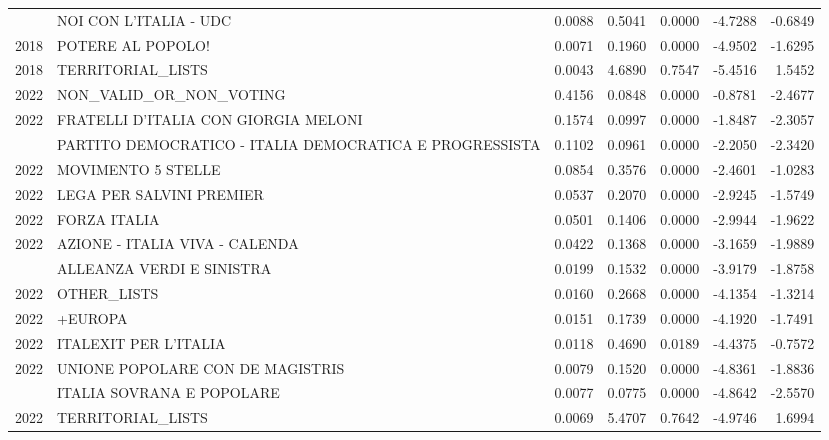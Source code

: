 \begin{longtable}[t]{rlrrrrr}
\addlinespace
2018 & NOI CON L'ITALIA - UDC & 0.0088 & 0.5041 & 0.0000 & -4.7288 & -0.6849\\
2018 & POTERE AL POPOLO! & 0.0071 & 0.1960 & 0.0000 & -4.9502 & -1.6295\\
2018 & TERRITORIAL\_LISTS & 0.0043 & 4.6890 & 0.7547 & -5.4516 & 1.5452\\
2022 & NON\_VALID\_OR\_NON\_VOTING & 0.4156 & 0.0848 & 0.0000 & -0.8781 & -2.4677\\
2022 & FRATELLI D'ITALIA CON GIORGIA MELONI & 0.1574 & 0.0997 & 0.0000 & -1.8487 & -2.3057\\
\addlinespace
2022 & PARTITO DEMOCRATICO - ITALIA DEMOCRATICA E PROGRESSISTA & 0.1102 & 0.0961 & 0.0000 & -2.2050 & -2.3420\\
2022 & MOVIMENTO 5 STELLE & 0.0854 & 0.3576 & 0.0000 & -2.4601 & -1.0283\\
2022 & LEGA PER SALVINI PREMIER & 0.0537 & 0.2070 & 0.0000 & -2.9245 & -1.5749\\
2022 & FORZA ITALIA & 0.0501 & 0.1406 & 0.0000 & -2.9944 & -1.9622\\
2022 & AZIONE - ITALIA VIVA - CALENDA & 0.0422 & 0.1368 & 0.0000 & -3.1659 & -1.9889\\
\addlinespace
2022 & ALLEANZA VERDI E SINISTRA & 0.0199 & 0.1532 & 0.0000 & -3.9179 & -1.8758\\
2022 & OTHER\_LISTS & 0.0160 & 0.2668 & 0.0000 & -4.1354 & -1.3214\\
2022 & +EUROPA & 0.0151 & 0.1739 & 0.0000 & -4.1920 & -1.7491\\
2022 & ITALEXIT PER L'ITALIA & 0.0118 & 0.4690 & 0.0189 & -4.4375 & -0.7572\\
2022 & UNIONE POPOLARE CON DE MAGISTRIS & 0.0079 & 0.1520 & 0.0000 & -4.8361 & -1.8836\\
\addlinespace
2022 & ITALIA SOVRANA E POPOLARE & 0.0077 & 0.0775 & 0.0000 & -4.8642 & -2.5570\\
2022 & TERRITORIAL\_LISTS & 0.0069 & 5.4707 & 0.7642 & -4.9746 & 1.6994\\
\bottomrule
\end{longtable}
